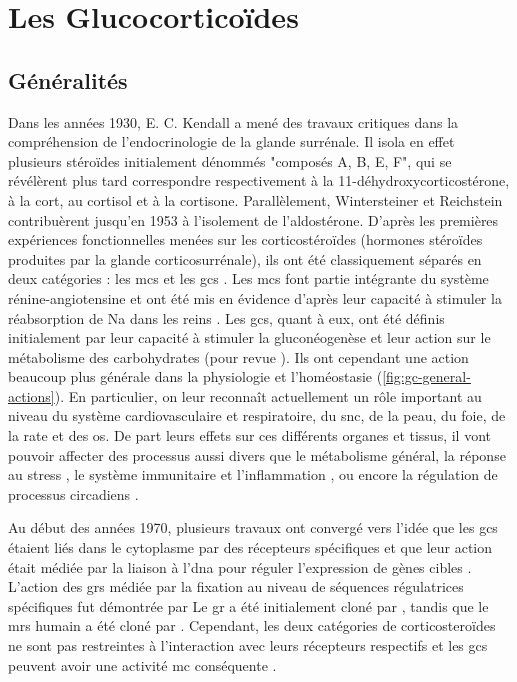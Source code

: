 \documentclass[../main.tex]{subfiles}
\begin{document}
\chapter{Les Glucocorticoïdes}


\section{Généralités}
Dans les années 1930, E. C. Kendall a mené des travaux critiques dans la compréhension de l'endocrinologie de la glande surrénale.
Il isola en effet plusieurs stéroïdes initialement dénommés "composés A, B, E, F", qui se révélèrent plus tard correspondre respectivement à la 11-déhydroxycorticostérone, à la \gls{cort}, au cortisol et à la cortisone.
Parallèlement, Wintersteiner et Reichstein contribuèrent jusqu'en 1953 à l'isolement de l'aldostérone.
D'après les premières expériences fonctionnelles menées sur les corticostéroïdes (hormones stéroïdes produites par la glande corticosurrénale), ils ont été classiquement séparés en deux catégories : les \glspl{mc} et les \glspl{gc} \citep{Simpson1952,Simpson1954}.
Les \glspl{mc} font partie intégrante du système rénine-angiotensine et ont été mis en évidence d'après leur capacité à stimuler la réabsorption de \gls{Na} dans les reins \citep{Gomez-Sanchez1996}.
Les \glspl{gc}, quant à eux, ont été définis initialement par leur capacité à stimuler la gluconéogenèse et leur action sur le métabolisme des carbohydrates (pour revue \citealp{McMahon1988}).
Ils ont cependant une action beaucoup plus générale dans la physiologie et l'homéostasie (\autoref{fig:gc-general-actions}).
En particulier, on leur reconnaît actuellement un rôle important au niveau du système cardiovasculaire et respiratoire, du \gls{snc}, de la peau, du foie, de la rate et des os.
De part leurs effets sur ces différents organes et tissus, il vont pouvoir affecter des processus aussi divers que le métabolisme général, la réponse au stress \citep{Sapolsky2000}, le système immunitaire et l'inflammation \citep{Busillo2013}, ou encore la régulation de processus circadiens \citep{Dickmeis2009}.



Au début des années 1970, plusieurs travaux ont convergé vers l'idée que les \glspl{gc} étaient liés dans le cytoplasme par des récepteurs spécifiques \citep{Baxter1971,Rousseau1972} et que leur action était médiée par la liaison à l'\gls{dna} pour réguler l'expression de gènes cibles \citep{Baxter1972,Payvar1981}.
L'action des \glspl{gr} médiée par la fixation au niveau de séquences régulatrices spécifiques fut démontrée par \citet{Chandler1983,Karin1984,Slater1985}
Le \gls{gr} a été initialement cloné par \citet{Weinberger1985}, tandis que le \glspl{mr} humain a été cloné par \citet{Arriza1987}.
Cependant, les deux catégories de corticosteroïdes ne sont pas restreintes à l'interaction avec leurs récepteurs respectifs et les \glspl{gc} peuvent avoir une activité \gls{mc} conséquente \citep{Funder1973,Reul1990}.
\end{document}

